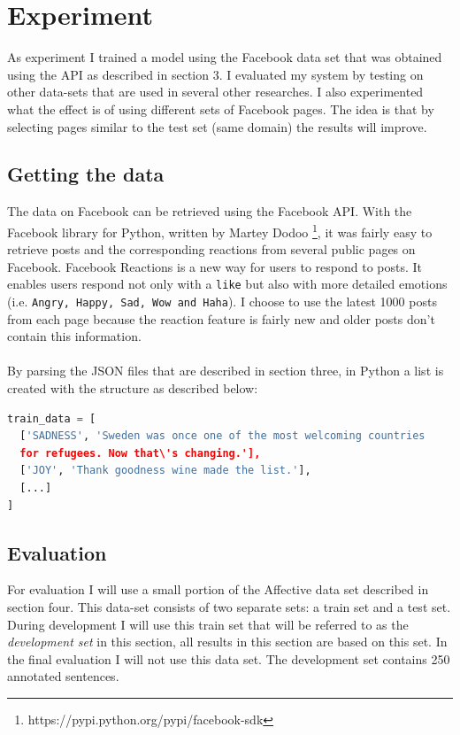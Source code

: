 \documentclass[
10pt, %
a4paper, %
oneside, %
headinclude,footinclude, %
BCOR5mm, %
]{scrartcl}
\begin{document}
\newpage
\section{Experiment}
As experiment I trained a model using the Facebook data set that was obtained using the API as described in section 3. I evaluated my system by testing on other data-sets that are used in several other researches. I also experimented what the effect is of using different sets of Facebook pages. The idea is that by selecting pages similar to the test set (same domain) the results will improve.

\subsection{Getting the data}
The data on Facebook can be retrieved using the Facebook API. With the Facebook library for Python, written by Martey Dodoo \footnote{https://pypi.python.org/pypi/facebook-sdk}, it was fairly easy to retrieve posts and the corresponding reactions from several public pages on Facebook. Facebook Reactions is a new way for users to respond to posts. It enables users respond not only with a \texttt{like} but also with more detailed emotions (i.e. \texttt{Angry, Happy, Sad, Wow and Haha}). I choose to use the latest 1000 posts from each page because the reaction feature is fairly new and older posts don't contain this information. \\\\
By parsing the JSON files that are described in section three, in Python a list is created with the structure as described below:
\begin{lstlisting}[language=python]
train_data = [
  ['SADNESS', 'Sweden was once one of the most welcoming countries
  for refugees. Now that\'s changing.'],
  ['JOY', 'Thank goodness wine made the list.'],
  [...]
]
\end{lstlisting}

\subsection{Evaluation}
For evaluation I will use a small portion of the Affective data set described in section four. This data-set consists of two separate sets: a train set and a test set. During development I will use this train set that will be referred to as the \textit{development set} in this section, all results in this section are based on this set. In the final evaluation I will not use this data set. The development set contains 250 annotated sentences.
\end{document}
